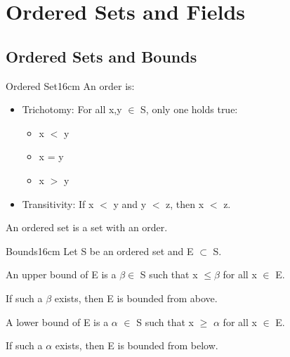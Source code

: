 \newpage
\section[Day 1: Ordered Sets \& Fields]{ Ordered Sets and Fields }

\subsection{ Ordered Sets and Bounds }

	\begin{definition}{Ordered Set}{16cm}
		An {\color{lblue} order} is:

		\begin{itemize}[leftmargin=1cm, itemsep=0.1cm]
			\item { \color{lgreen} Trichotomy}:
				For all x,y $ \in $ S, only one holds true:

				\begin{itemize}[leftmargin=1cm, itemsep=0.1cm]
					\item x $<$ y
					\item x = y
					\item x $>$ y
				\end{itemize}

			\item { \color{lgreen} Transitivity}:
				If x $<$ y and y $<$ z, then x $<$ z.
		\end{itemize}

		An ordered set is a set with an order.
	\end{definition}	

	\vspace{0.5cm}



	\begin{definition}{Bounds}{16cm}
		Let S be an ordered set and E $ \subset $ S.

		An {\color{lblue} upper bound} of E is a $ \beta \in $ S such that
		x $ \leq \beta $ for all x $ \in $ E.

		\hspace{0.5cm}
		If such a $ \beta $ exists, then E is bounded from above.

		A {\color{lblue} lower bound} of E is a $\alpha$ $\in$ S such that
		x $ \geq $ $\alpha$ for all x $\in$ E.

		\hspace{0.5cm}
		If such a $\alpha$ exists, then E is bounded from below.	
	\end{definition}

